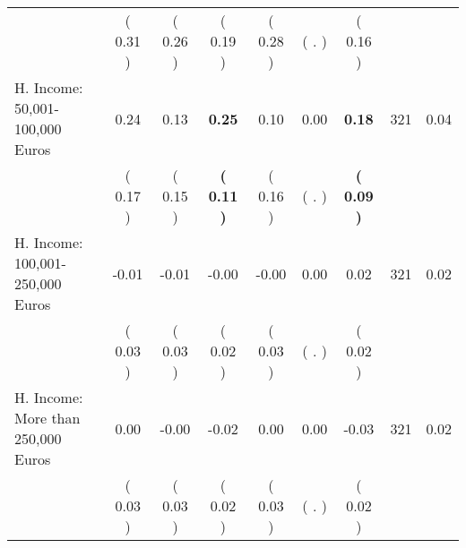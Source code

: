 \begin{tabular}{lcccccccc}
 & (     0.31 ) & (     0.26 ) & (     0.19 ) & (     0.28 ) & (        . ) & (     0.16 ) & \\
H. Income: 50,001-100,000 Euros &      0.24 &      0.13 & \textbf{     0.25} &      0.10 &      0.00 & \textbf{     0.18} & 321 &       0.04 \\ 
 & (     0.17 ) & (     0.15 ) & \textbf{(     0.11 )} & (     0.16 ) & (        . ) & \textbf{(     0.09 )} & \\
H. Income: 100,001-250,000 Euros &     -0.01 &     -0.01 &     -0.00 &     -0.00 &      0.00 &      0.02 & 321 &       0.02 \\ 
 & (     0.03 ) & (     0.03 ) & (     0.02 ) & (     0.03 ) & (        . ) & (     0.02 ) & \\
H. Income: More than 250,000 Euros &      0.00 &     -0.00 &     -0.02 &      0.00 &      0.00 &     -0.03 & 321 &       0.02 \\ 
 & (     0.03 ) & (     0.03 ) & (     0.02 ) & (     0.03 ) & (        . ) & (     0.02 ) & \\
\bottomrule
\end{tabular}
